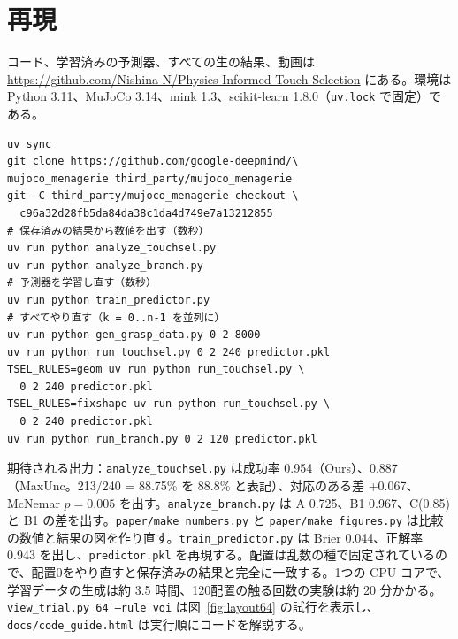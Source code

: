 \documentclass[conference]{IEEEtran}
\newcommand{\Ours}{Ours}
\newcommand{\Unc}{MaxUnc}
\begin{document}
\section{再現}\label{app:repro}
コード、学習済みの予測器、すべての生の結果、動画は \url{https://github.com/Nishina-N/Physics-Informed-Touch-Selection} にある。環境は Python 3.11、MuJoCo 3.14、mink 1.3、scikit-learn 1.8.0（\texttt{uv.lock} で固定）である。
\begin{footnotesize}
\begin{verbatim}
uv sync
git clone https://github.com/google-deepmind/\
mujoco_menagerie third_party/mujoco_menagerie
git -C third_party/mujoco_menagerie checkout \
  c96a32d28fb5da84da38c1da4d749e7a13212855
# 保存済みの結果から数値を出す（数秒）
uv run python analyze_touchsel.py
uv run python analyze_branch.py
# 予測器を学習し直す（数秒）
uv run python train_predictor.py
# すべてやり直す（k = 0..n-1 を並列に）
uv run python gen_grasp_data.py 0 2 8000
uv run python run_touchsel.py 0 2 240 predictor.pkl
TSEL_RULES=geom uv run python run_touchsel.py \
  0 2 240 predictor.pkl
TSEL_RULES=fixshape uv run python run_touchsel.py \
  0 2 240 predictor.pkl
uv run python run_branch.py 0 2 120 predictor.pkl
\end{verbatim}
\end{footnotesize}
期待される出力：\texttt{analyze\_touchsel.py} は成功率 0.954（\Ours）、0.887（\Unc。213/240 = 88.75\% を 88.8\% と表記）、対応のある差 +0.067、McNemar $p=0.005$ を出す。\texttt{analyze\_branch.py} は A 0.725、B1 0.967、C(0.85) と B1 の差を出す。\texttt{paper/make\_numbers.py} と \texttt{paper/make\_figures.py} は比較の数値と結果の図を作り直す。\texttt{train\_predictor.py} は Brier 0.044、正解率 0.943 を出し、\texttt{predictor.pkl} を再現する。配置は乱数の種で固定されているので、配置0をやり直すと保存済みの結果と完全に一致する。1つの CPU コアで、学習データの生成は約 3.5 時間、120配置の触る回数の実験は約 20 分かかる。\texttt{view\_trial.py 64 --rule voi} は図~\ref{fig:layout64} の試行を表示し、\texttt{docs/code\_guide.html} は実行順にコードを解説する。
\end{document}

